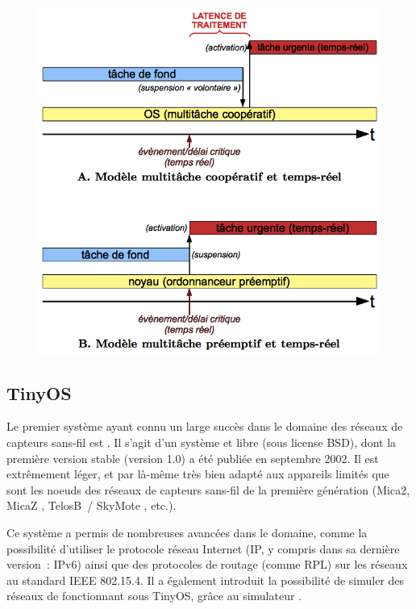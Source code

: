 \begin{figure}[!hbt]
\centering
\includegraphics[width=12.75cm]{images/ch3-modeles-multitache.png}
\label{FigModeleMultitache}
\end{figure}


\subsection{TinyOS}
\label{SubsecTinyOS}

Le premier système ayant connu un large succès dans le domaine des réseaux
de capteurs sans-fil est  \cite{TinyOS}. Il s'agit d'un système
 et libre (sous license BSD), dont la première version
stable (version 1.0) a été publiée en septembre 2002. Il est extrêmement
léger, et par là-même très bien adapté aux appareils limités que sont
les noeuds des réseaux de capteurs sans-fil de la première génération
(Mica2, MicaZ \cite{DSMicaZ}, TelosB~/ SkyMote \cite{DSTelosB}, etc.).

Ce système a permis de nombreuses avancées dans le domaine, comme la
possibilité d'utiliser le protocole réseau Internet (IP, y compris dans
sa dernière version~: IPv6) ainsi que des protocoles de routage (comme
RPL) sur les réseaux au standard IEEE 802.15.4. Il a également introduit
la possibilité de simuler des réseaux de  fonctionnant sous
TinyOS, grâce au simulateur  \cite{TOSSIM}.

